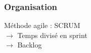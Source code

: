 \begin{frame}
\frametitle{Organisation}
Méthode agile : SCRUM\\
$\rightarrow$ Temps divisé en sprint\\
$\rightarrow$ Backlog
\end{frame}
